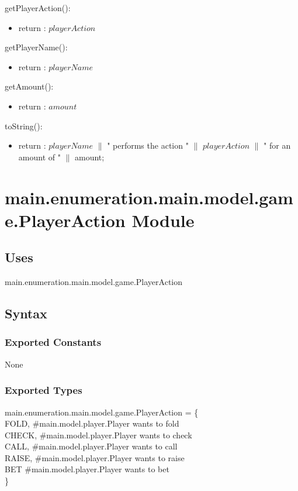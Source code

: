 \documentclass[12pt, titlepage]{article}
\begin{document}
        \noindent getPlayerAction():
        \begin{itemize}
        \item return : $playerAction$
        \end{itemize}
        
        \noindent getPlayerName():
        \begin{itemize}
        \item return : $playerName$
        \end{itemize}
        
        \noindent getAmount():
        \begin{itemize}
        \item return : $amount$
        \end{itemize}
        
        \noindent toString():
        \begin{itemize}
        \item return : $playerName$ $\|$ " performs the action " $\|$ $playerAction$ $\|$ " for an amount of " $\|$ amount;
        \end{itemize}        
                
                      
        
\section* {main.enumeration.main.model.game.PlayerAction Module}
    \subsection* {Uses}
    main.enumeration.main.model.game.PlayerAction
    \subsection* {Syntax}
    
        \subsubsection* {Exported Constants}
            None
        \subsubsection* {Exported Types}
            main.enumeration.main.model.game.PlayerAction = \{ \\
            FOLD, \#main.model.player.Player wants to fold \\
            CHECK, \#main.model.player.Player wants to check \\
            CALL, \#main.model.player.Player wants to call \\
            RAISE, \#main.model.player.Player wants to raise \\
            BET \#main.model.player.Player wants to bet \\
            \}
\end{document}
